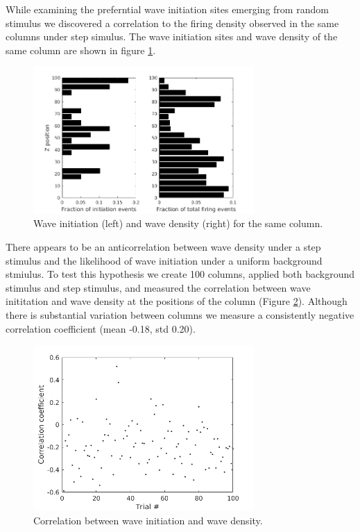 \documentclass[a4paper,11pt]{article}
\begin{document}
While examining the preferntial wave initiation sites emerging from random stimulus we discovered a correlation to the firing density observed in the same columns under step simulus.
The wave initiation sites and wave density of the same column are shown in figure \ref{fig:initiation_density}.
\begin{figure}[!htb]
 \caption{Wave initiation (left) and wave density (right) for the same column.}
 \label{fig:initiation_density}
 \centering
   \includegraphics[width=0.75\textwidth]{fig/InitiationCorrelationHistogram}
\end{figure}
There appears to be an anticorrelation between wave density under a step stimulus and the likelihood of wave initiation under a uniform background stmiulus.
To test this hypothesis we create 100 columns, applied both background stimulus and step stimulus, and measured the correlation between wave inititation and wave density at the positions of the column (Figure \ref{fig:initiation_density_corr}).
Although there is substantial variation between columns we measure a consistently negative correlation coefficient (mean -0.18, std 0.20).
\begin{figure}[!htb]
 \caption{Correlation between wave initiation and wave density.}
 \label{fig:initiation_density_corr}
 \centering
   \includegraphics[width=0.75\textwidth]{fig/InitiationCorrelation}
\end{figure}
\end{document}
